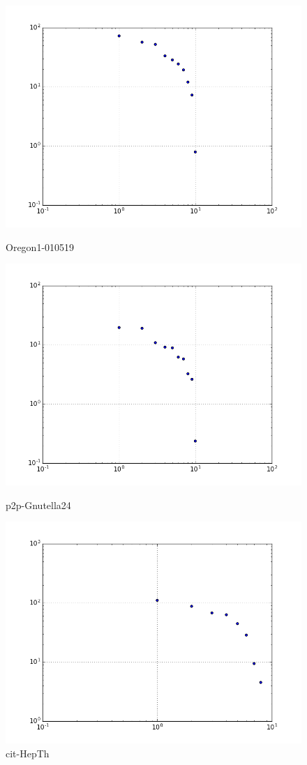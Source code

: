 \begin{figure}[H]
  \includegraphics[width=\linewidth]{img/oregon-010519/eig.png}
  \caption*{Oregon1-010519}
\endminipage\hfill
{}
  \includegraphics[width=\linewidth]{img/p2p-Gnutella24/eig.png}
  \caption*{p2p-Gnutella24}
\endminipage\hfill
{}
  \includegraphics[width=\linewidth]{img/cit-HepTh/eig.png}
  \caption*{cit-HepTh}
\endminipage
\end{figure}


